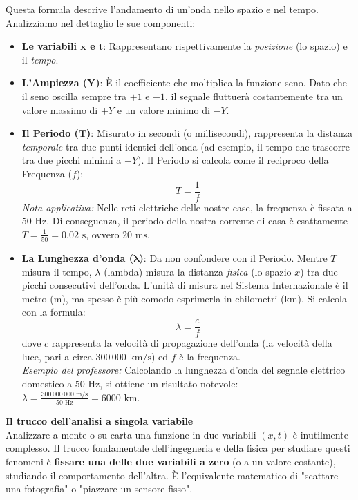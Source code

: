 \documentclass[12pt, a4paper]{article}
\begin{document}
	Questa formula descrive l'andamento di un'onda nello spazio e nel tempo. Analizziamo nel dettaglio le sue componenti:
	\begin{itemize}[label=\textcolor{titlecolor}{\Large\textbullet}, itemsep=6pt, parsep=2pt, leftmargin=1.5cm]
		\item \textbf{Le variabili $\boldsymbol{x}$ e $\boldsymbol{t}$}: Rappresentano rispettivamente la \textit{posizione} (lo spazio) e il \textit{tempo}.
		
		\item \textbf{L'Ampiezza ($\boldsymbol{Y}$)}: È il coefficiente che moltiplica la funzione seno. Dato che il seno oscilla sempre tra $+1$ e $-1$, il segnale fluttuerà costantemente tra un valore massimo di $+Y$ e un valore minimo di $-Y$.
		
		\item \textbf{Il Periodo ($\boldsymbol{T}$)}: Misurato in secondi (o millisecondi), rappresenta la distanza \textit{temporale} tra due punti identici dell'onda (ad esempio, il tempo che trascorre tra due picchi minimi a $-Y$). Il Periodo si calcola come il reciproco della Frequenza ($f$):
		\[
		T = \frac{1}{f}
		\]
		\textit{Nota applicativa:} Nelle reti elettriche delle nostre case, la frequenza è fissata a $50\text{ Hz}$. Di conseguenza, il periodo della nostra corrente di casa è esattamente $T = \frac{1}{50} = 0.02\text{ s}$, ovvero $20\text{ ms}$.
		
		\item \textbf{La Lunghezza d'onda ($\boldsymbol{\lambda}$)}: Da non confondere con il Periodo. Mentre $T$ misura il tempo, $\lambda$ (lambda) misura la distanza \textit{fisica} (lo spazio $x$) tra due picchi consecutivi dell'onda. L'unità di misura nel Sistema Internazionale è il metro (m), ma spesso è più comodo esprimerla in chilometri (km). Si calcola con la formula:
		\[
		\lambda = \frac{c}{f}
		\]
		dove $c$ rappresenta la velocità di propagazione dell'onda (la velocità della luce, pari a circa $300\,000\text{ km/s}$) ed $f$ è la frequenza. \\
		\textit{Esempio del professore:} Calcolando la lunghezza d'onda del segnale elettrico domestico a $50\text{ Hz}$, si ottiene un risultato notevole: $\lambda = \frac{300\,000\,000\text{ m/s}}{50\text{ Hz}} = 6000\text{ km}$.
	\end{itemize}
	
	\vspace{0.4cm}
	\textbf{Il trucco dell'analisi a singola variabile}\\
	Analizzare a mente o su carta una funzione in due variabili $(x, t)$ è inutilmente complesso. Il trucco fondamentale dell'ingegneria e della fisica per studiare questi fenomeni è \textbf{fissare una delle due variabili a zero} (o a un valore costante), studiando il comportamento dell'altra. È l'equivalente matematico di "scattare una fotografia" o "piazzare un sensore fisso".
	
\end{document}
